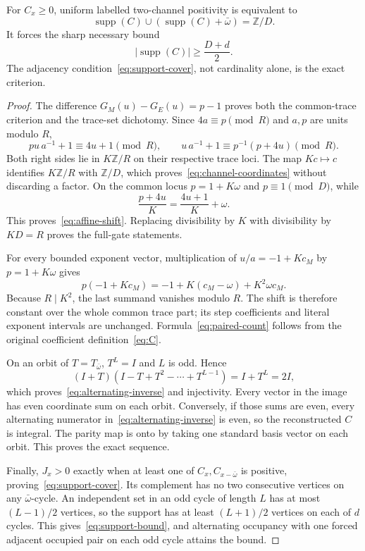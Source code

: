 \begin{theorem}
For $C_x\ge0$, uniform labelled two-channel positivity is equivalent to
\begin{equation}\label{eq:support-cover}
 \operatorname{supp}(C)\cup
 (\operatorname{supp}(C)+\bar\omega)=\mathbb Z/D.
\end{equation}
It forces the sharp necessary bound
\begin{equation}\label{eq:support-bound}
 |\operatorname{supp}(C)|\ge \frac{D+d}{2}.
\end{equation}
The adjacency condition~\eqref{eq:support-cover}, not cardinality alone, is
the exact criterion.
\end{theorem}

\begin{proof}
The difference $G_M(u)-G_E(u)=p-1$ proves both the common-trace criterion and
the trace-set dichotomy. Since $4a\equiv p\pmod R$ and $a,p$ are units modulo
$R$,
\[
 pu\,a^{-1}+1\equiv4u+1\pmod R,
 \qquad
 u\,a^{-1}+1\equiv p^{-1}(p+4u)\pmod R.
\]
Both right sides lie in $K\mathbb Z/R$ on their respective trace loci.
The map $Kc\mapsto c$ identifies $K\mathbb Z/R$ with $\mathbb Z/D$, which
proves~\eqref{eq:channel-coordinates} without discarding a factor. On the
common locus $p=1+K\omega$ and $p\equiv1\pmod D$, while
\[
 \frac{p+4u}{K}=\frac{4u+1}{K}+\omega.
\]
This proves~\eqref{eq:affine-shift}. Replacing divisibility by $K$ with
divisibility by $KD=R$ proves the full-gate statements.

For every bounded exponent vector, multiplication of
$u/a=-1+Kc_M$ by $p=1+K\omega$ gives
\[
 p(-1+Kc_M)=-1+K(c_M-\omega)+K^2\omega c_M.
\]
Because $R\mid K^2$, the last summand vanishes modulo $R$. The shift is
therefore constant over the whole common trace part; its step coefficients
and literal exponent intervals are unchanged. Formula~\eqref{eq:paired-count}
follows from the original coefficient definition~\eqref{eq:C}.

On an orbit of $T=T_{\bar\omega}$, $T^L=I$ and $L$ is odd. Hence
\[
 (I+T)(I-T+T^2-\cdots+T^{L-1})=I+T^L=2I,
\]
which proves~\eqref{eq:alternating-inverse} and injectivity. Every vector in
the image has even coordinate sum on each orbit. Conversely, if those sums
are even, every alternating numerator in~\eqref{eq:alternating-inverse} is
even, so the reconstructed $C$ is integral. The parity map is onto by taking
one standard basis vector on each orbit. This proves the exact sequence.

Finally, $J_x>0$ exactly when at least one of $C_x,C_{x-\bar\omega}$ is
positive, proving~\eqref{eq:support-cover}. Its complement has no two
consecutive vertices on any $\bar\omega$-cycle. An independent set in an odd
cycle of length $L$ has at most $(L-1)/2$ vertices, so the support has at least
$(L+1)/2$ vertices on each of $d$ cycles. This gives~\eqref{eq:support-bound},
and alternating occupancy with one forced adjacent occupied pair on each odd
cycle attains the bound.
\end{proof}

